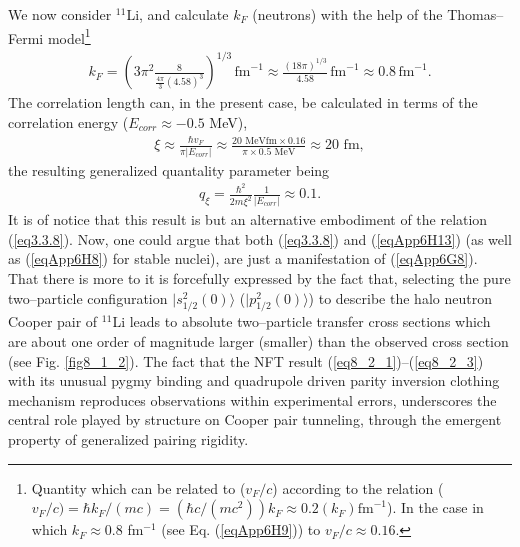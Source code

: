 \begin{subappendices}
We now consider $^{11}$Li, and calculate $k_F$ (neutrons) with the help of the Thomas--Fermi model\footnote{Quantity which can be related to ($v_F/c$) according to the relation ($v_F/c)=\hbar k_F/(mc)=(\hbar c/(mc^2))k_F\approx0.2(k_F){\text{fm}^{-1}}$). In the case in which $k_F\approx 0.8 $ fm$^{-1}$ (see Eq. (\ref{eqApp6H9})) to $v_F/c\approx 0.16$. }
\begin{align}\label{eqApp6H9}
k_F=\left(3\pi^2\frac{8}{\frac{4\pi}{3}(4.58)^3}\right)^{1/3}\,\text{fm}^{-1}\approx\frac{(18\pi)^{1/3}}{4.58}\,\text{fm}^{-1}\approx 0.8\,\text{fm}^{-1}.
\end{align} 
The correlation length can, in the present case, be calculated in terms of the correlation energy ($E_{corr}\approx-0.5$ MeV), 
\begin{align}
\xi\approx \frac{\hbar v_F}{\pi|E_{corr}|}\approx \frac{20 \text{ MeVfm}\times0.16}{\pi\times 0.5\text{ MeV}}\approx 20\text{ fm},
\end{align}
 the resulting generalized quantality parameter being
\begin{align}\label{eqApp6H13}
q_\xi=\frac{\hbar^2}{2m\xi^2}\frac{1}{|E_{corr}|}\approx 0.1.
\end{align}
It is of notice that this result is but an alternative embodiment of the relation (\ref{eq3.3.8}). Now, one could argue that both (\ref{eq3.3.8}) and (\ref{eqApp6H13}) (as well as (\ref{eqApp6H8}) for stable nuclei), are just a manifestation of (\ref{eqApp6G8}). That there is more to it is forcefully expressed by the fact that, selecting the pure two--particle configuration $|s_{1/2}^2(0)\rangle$ ($|p_{1/2}^2(0)\rangle$) to describe the halo neutron Cooper pair of $^{11}$Li leads to absolute two--particle transfer cross sections which are about one order of magnitude larger (smaller) than the observed cross section (see Fig. \ref{fig8_1_2}). The fact that the NFT result (\ref{eq8_2_1})--(\ref{eq8_2_3}) with its unusual pygmy binding and quadrupole driven parity inversion clothing mechanism reproduces observations within experimental errors, underscores the central role played by structure on Cooper pair tunneling, through the emergent property of generalized pairing rigidity.

\end{subappendices}
